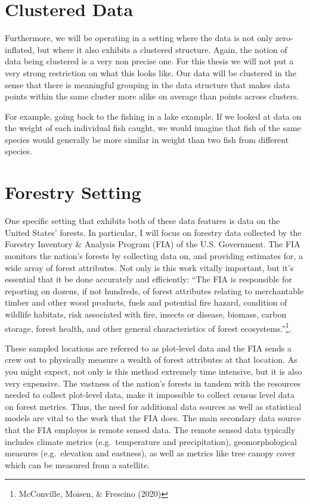 \documentclass[12pt,twoside]{reedthesis}
\begin{document}
\hypertarget{clustered-data}{%
\section{Clustered Data}\label{clustered-data}}

Furthermore, we will be operating in a setting where the data is not only zero-inflated, but where it also exhibits a clustered structure. Again, the notion of data being clustered is a very non precise one. For this thesis we will not put a very strong restriction on what this looks like. Our data will be clustered in the sense that there is meaningful grouping in the data structure that makes data points within the same cluster more alike on average than points across clusters.

For example, going back to the fishing in a lake example. If we looked at data on the weight of each individual fish caught, we would imagine that fish of the same species would generally be more similar in weight than two fish from different species.

\hypertarget{forestry-setting}{%
\section{Forestry Setting}\label{forestry-setting}}

One specific setting that exhibits both of these data features is data on the United States' forests. In particular, I will focus on forestry data collected by the Forestry Inventory \& Analysis Program (FIA) of the U.S. Government. The FIA monitors the nation's forests by collecting data on, and providing estimates for, a wide array of forest attributes. Not only is this work vitally important, but it's essential that it be done accurately and efficiently: ``The FIA is responsible for reporting on dozens, if not hundreds, of forest attributes relating to merchantable timber and other wood products, fuels and potential fire hazard, condition of wildlife habitats, risk associated with fire, insects or disease, biomass, carbon storage, forest health, and other general characteristics of forest ecosystems.''\footnote{McConville, Moisen, \& Frescino (2020)}.

These sampled locations are referred to as plot-level data and the FIA sends a crew out to physically measure a wealth of forest attributes at that location. As you might expect, not only is this method extremely time intensive, but it is also very expensive. The vastness of the nation's forests in tandem with the resources needed to collect plot-level data, make it impossible to collect census level data on forest metrics. Thus, the need for additional data sources as well as statistical models are vital to the work that the FIA does. The main secondary data source that the FIA employes is remote sensed data. The remote sensed data typically includes climate metrics (e.g.~temperature and precipitation), geomorphological measures (e.g.~elevation and eastness), as well as metrics like tree canopy cover which can be measured from a satellite.
\end{document}
